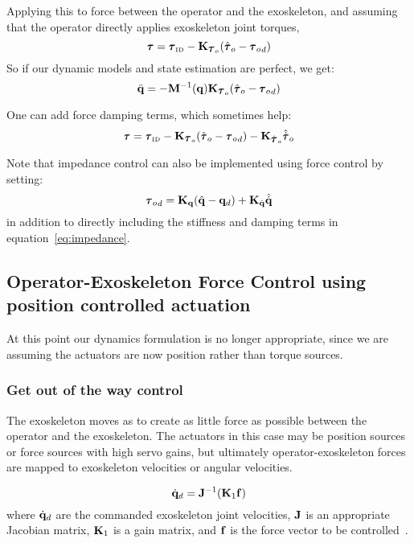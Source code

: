\documentclass[letterpaper,12pt,fullpage]{article}
\newcommand{\invdyn}{{\mbox {\tiny ID}}}
\begin{document}
Applying this to force between the operator and the exoskeleton, and assuming
that the operator directly applies exoskeleton joint torques,
\begin{equation}
\vtau = \vtau_{\invdyn} - \mK_{\vtau_o} ( \hat{\vtau}_o - {\vtau_o}_d )
\end{equation}
So if our dynamic models and state estimation are perfect, we get:
\begin{equation}
\ddot{\vq} = - \mM^{-1} (\vq) \mK_{\vtau_o} ( \hat{\vtau}_o - {\vtau_o}_d )
\end{equation}

One can add force damping terms, which sometimes help:
\begin{equation}
\vtau = \vtau_{\invdyn} - \mK_{\vtau_o} ( \hat{\vtau}_o - {\vtau_o}_d )
- \mK_{\dot{\vtau}_o} \hat{\dot{\vtau}}_o
\end{equation}

Note that impedance control can also be implemented using force control
by setting:
\begin{equation}
{\vtau_o}_d = \mK_{\vq}( \hat{\vq} - \vq_d ) + \mK_{\dot{\vq}} \hat{\dot{\vq}}
\end{equation}
in addition to directly including the stiffness and damping terms in
equation~\ref{eq:impedance}. 

\subsection{Operator-Exoskeleton Force Control using position controlled actuation}

At this point our dynamics formulation is no longer appropriate, since we
are assuming the actuators are now position rather than torque sources.

\subsubsection{Get out of the way control}

The exoskeleton moves as to create as little force as possible between the
operator and the exoskeleton. The actuators in this case may be position sources or
force sources with high servo gains,
but ultimately operator-exoskeleton forces are mapped
to exoskeleton velocities or angular velocities.

\begin{equation}
\dot{{\bf q}}_d = {\bf J}^{-1} ({\bf K}_1 {\bf f})
\label{eq:gootwcps}
\end{equation}
where $\dot{{\bf q}}_d$ are the commanded exoskeleton joint velocities,
${\bf J}$ is an appropriate Jacobian matrix, ${\bf K}_1$ is a gain matrix,
and ${\bf f}$ is the force vector to be controlled~\cite{IEEE06990981}.
\end{document}

